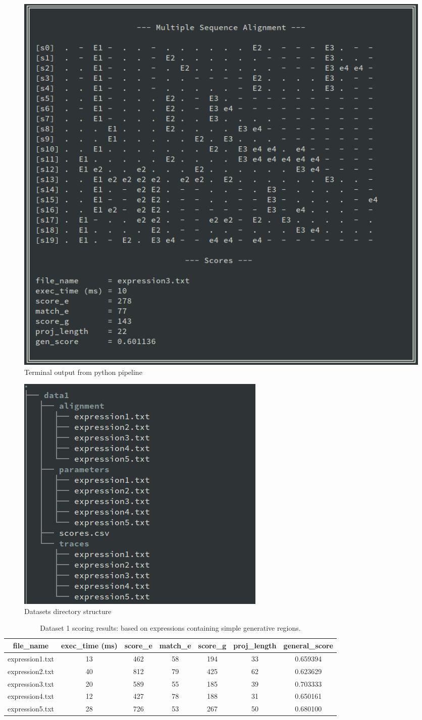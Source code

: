 \documentclass[12pt,a4paper]{article}
\begin{document}
\begin{figure}[H]
	\centering
	\includegraphics[width=0.75\linewidth]{img/terminal_output.png}
	\caption{Terminal output from python pipeline}
	\label{fig:output}
\end{figure}

\begin{figure}[H]
	\centering
	\includegraphics[width=0.45\linewidth]{img/terminal_tree.png}
	\caption{Datasets directory structure}
	\label{fig:tree}
\end{figure}


\pagebreak


\begin{table}[H]
	\begin{center}
		\caption{Dataset 1 scoring results: based on expressions containing simple generative regions.}
		\label{tab:dataset1}
		\begin{tabular}{|c|c|c|c|c|c|c|}
			\hline
			\textbf{file\_name} & \textbf{exec\_time} (ms) & \textbf{score\_e} & \textbf{match\_e} & \textbf{score\_g} & \textbf{proj\_length} & \textbf{general\_score} \\
			\hline\hline
			expression1.txt & 13 & 462 & 58 & 194 & 33 & 0.659394 \\
			\hline
			expression2.txt & 40 & 812 & 79 & 425 & 62 & 0.623629 \\
			\hline
			expression3.txt & 20 & 589 & 55 & 185 & 39 & 0.703333 \\
			\hline
			expression4.txt & 12 & 427 & 78 & 188 & 31 & 0.650161 \\
			\hline
			expression5.txt & 28 & 726 & 53 & 267 & 50 & 0.680100 \\
			\hline
		\end{tabular}
	\end{center}
\end{table}
\end{document}

